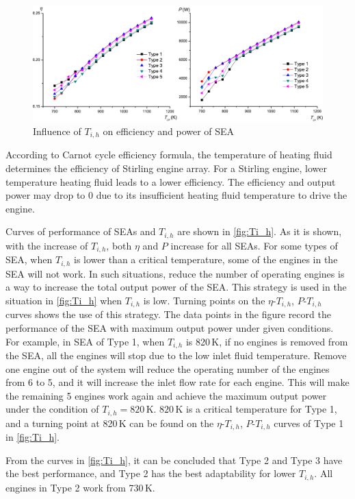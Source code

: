 \begin{figure}[htpb]
\centering
	\includegraphics[width = 0.7\columnwidth]{fig/T_ih}
	\caption{Influence of $T_{i,h}$ on efficiency and power of SEA}
	\label{fig:Ti_h}
\end{figure}
According to Carnot cycle efficiency formula, the temperature of heating fluid determines the efficiency of Stirling engine array. For a Stirling engine, lower temperature heating fluid leads to a lower efficiency. The efficiency and output power may drop to 0 due to its insufficient heating fluid temperature to drive the engine.

Curves of performance of SEAs and $T_{i,h}$ are shown in \autoref{fig:Ti_h}.
As it is shown, with the increase of $T_{i,h}$, both $\eta$ and $P$ increase for all SEAs. For some types of SEA, when $T_{i,h}$ is lower than a critical temperature, some of the engines in the SEA will not work. In such situations, reduce the number of operating engines is a way to increase the total output power of the SEA. This strategy is used in the situation in \autoref{fig:Ti_h} when $T_{i,h}$ is low. Turning points on the $\eta$-$T_{i,h}$, $P$-$T_{i,h}$ curves shows the use of this strategy. The data points in the figure record the performance of the SEA with maximum output power under given conditions. 
For example, in SEA of Type 1, when $T_{i,h}$ is  820\,K, if no engines is removed from the SEA, all the engines will stop due to the low inlet fluid temperature. Remove one engine out of the system will reduce the operating number of the engines from 6 to 5, and it will increase the inlet flow rate for each engine. This will make the remaining 5 engines work again and achieve the maximum output power under the condition of $T_{i,h} = 820\,\mathrm{K}$. $820\,\mathrm{K}$ is a critical temperature for Type 1, and a turning point at 820\,K can be found on the $\eta$-$T_{i,h}$, $P$-$T_{i,h}$ curves of Type 1 in \autoref{fig:Ti_h}. 

From the curves in \autoref{fig:Ti_h}, it can be concluded that Type 2 and Type 3 have the best performance, and Type 2 has the best adaptability for lower $T_{i,h}$. All engines in Type 2 work from 730\,K.

